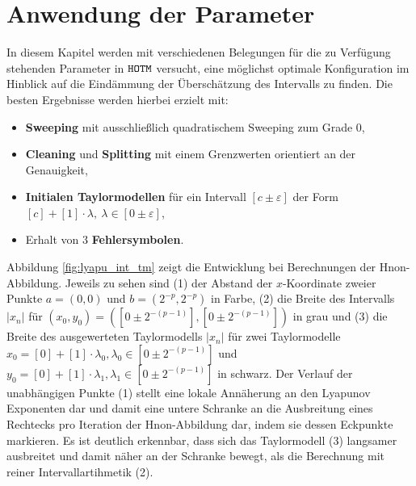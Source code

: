  \section{Anwendung der Parameter}
 \label{sec:anwendung}
 In diesem Kapitel werden mit verschiedenen Belegungen für die zu Verfügung stehenden Parameter in $\verb+HOTM+$ versucht, eine möglichst optimale Konfiguration im Hinblick auf die Eindämmung der Überschätzung des Intervalls zu finden. Die besten Ergebnisse werden hierbei erzielt mit: 
 \begin{itemize}
  \item \textbf{Sweeping} mit ausschließlich quadratischem Sweeping zum Grade 0,
  \item \textbf{Cleaning} und \textbf{Splitting} mit einem Grenzwerten orientiert an der Genauigkeit,
  \item \textbf{Initialen Taylormodellen} für ein Intervall $[c \pm \varepsilon]$ der Form $[c] + [1] \cdot \lambda,\  \lambda \in [0 \pm \varepsilon]$,
  \item Erhalt von 3 \textbf{Fehlersymbolen}.
 \end{itemize}
Abbildung \ref{fig:lyapu_int_tm} zeigt die Entwicklung bei Berechnungen der H\e non-Abbildung. Jeweils zu sehen sind (1) der Abstand der $x$-Koordinate zweier Punkte $a=(0,0)$ und $b=(2^{-p},2^{-p})$ in Farbe, (2) die Breite des Intervalls $|x_n|$ für $(x_0, y_0)=([0\pm 2^{-(p-1)}],[0\pm 2^{-(p-1)}])$ in grau und (3) die Breite des ausgewerteten Taylormodells $|x_n|$ für zwei Taylormodelle $x_0 = [0] + [1]\cdot \lambda_0, \lambda_0\in [0\pm 2^{-(p-1)}]$ und $y_0 = [0] + [1]\cdot \lambda_1, \lambda_1\in [0\pm 2^{-(p-1)}]$ in schwarz. Der Verlauf der unabhängigen Punkte (1) stellt eine lokale Annäherung an den Lyapunov Exponenten dar und damit eine untere Schranke an die Ausbreitung eines Rechtecks pro Iteration der H\e non-Abbildung dar, indem sie dessen Eckpunkte markieren. Es ist deutlich erkennbar, dass sich das Taylormodell (3) langsamer ausbreitet und damit näher an der Schranke bewegt, als die Berechnung mit reiner Intervallartihmetik (2).
 
 
 
